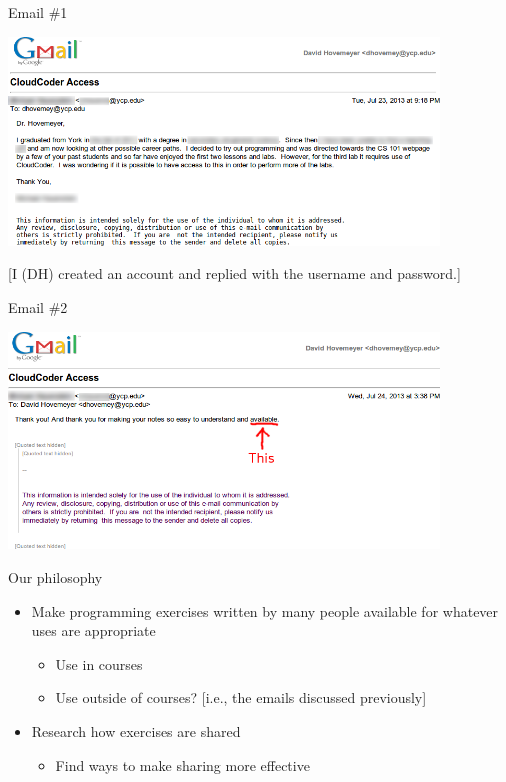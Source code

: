 \documentclass{beamer}
\begin{document}
\begin{frame}{Email \#1}

\begin{center}
\includegraphics[width=4.5in]{images/email1}
\end{center}

[I (DH) created an account and replied with the username and password.]

\end{frame}

\begin{frame}{Email \#2}

\begin{center}
\includegraphics[width=4.5in]{images/email2}
\end{center}

\end{frame}

\begin{frame}{Our philosophy}

\begin{itemize}
  \item Make programming exercises written by many people available
        for whatever uses are appropriate
  \begin{itemize}
    \item Use in courses
    \item Use outside of courses? [i.e., the emails discussed previously]
  \end{itemize}
  \item Research how exercises are shared
  \begin{itemize}
    \item Find ways to make sharing more effective
  \end{itemize}
\end{itemize}

\end{frame}
\end{document}
